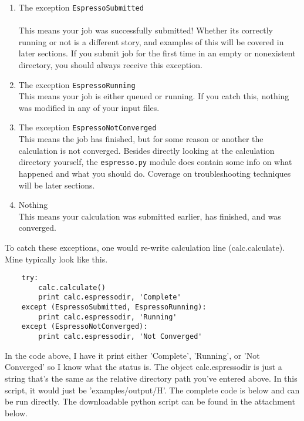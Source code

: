 \documentclass[colorlinks=true,urlcolor=blue,linkcolor=blue,citecolor=red]{article}
\begin{document}
\begin{enumerate}
\item The exception \texttt{EspressoSubmitted} \\ \\
   This means your job was successfully submitted! Whether its correctly running or not is a different story, and examples of this will be covered in later sections. If you submit job for the first time in an empty or nonexistent directory, you should always receive this exception.

\item The exception \texttt{EspressoRunning} \\
   This means your job is either queued or running. If you catch this, nothing was modified in any of your input files.

\item The exception \texttt{EspressoNotConverged} \\
   This means the job has finished, but for some reason or another the calculation is not converged. Besides directly looking at the calculation directory yourself, the \texttt{espresso.py} module does contain some info on what happened and what you should do. Coverage on troubleshooting techniques will be later sections.

\item Nothing \\
   This means your calculation was submitted earlier, has finished, and was converged.
\end{enumerate}

To catch these exceptions, one would re-write calculation line (calc.calculate). Mine typically look like this.

\begin{verbatim}
    try:
        calc.calculate()
        print calc.espressodir, 'Complete'
    except (EspressoSubmitted, EspressoRunning):
        print calc.espressodir, 'Running'
    except (EspressoNotConverged):
        print calc.espressodir, 'Not Converged'
\end{verbatim}

In the code above, I have it print either 'Complete', 'Running', or 'Not Converged' so I know what the status is. The object calc.espressodir is just a string that's the same as the relative directory path you've entered above. In this script, it would just be 'examples/output/H'. The complete code is below and can be run directly. The downloadable python script can be found in the attachment below.
\end{document}

